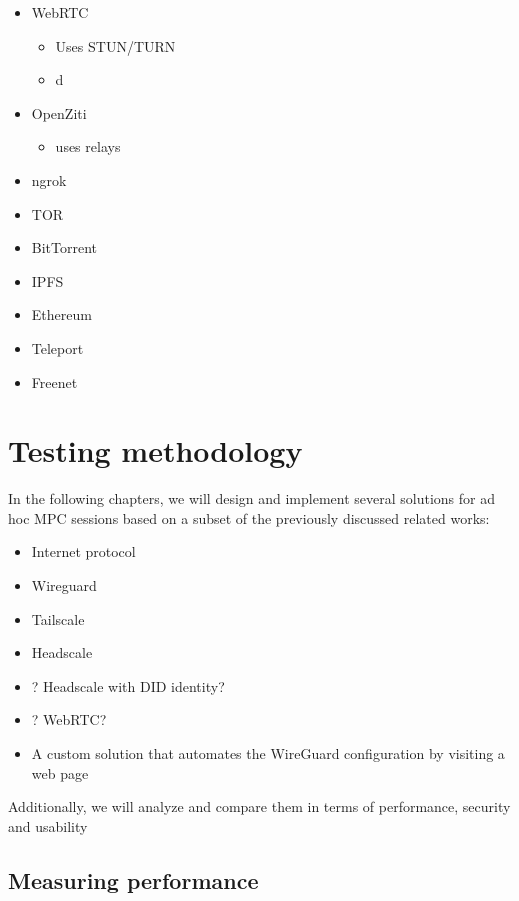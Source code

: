 \begin{itemize}
\tightlist
\item
  WebRTC

  \begin{itemize}
  \tightlist
  \item
    Uses STUN/TURN
  \item
    d
  \end{itemize}
\item
  OpenZiti

  \begin{itemize}
  \tightlist
  \item
    uses relays
  \end{itemize}
\item
  ngrok
\item
  TOR
\item
  BitTorrent
\item
  IPFS
\item
  Ethereum
\item
  Teleport
\item
  Freenet
\end{itemize}

\hypertarget{testing-methodology}{%
\chapter{Testing methodology}\label{testing-methodology}}

In the following chapters, we will design and implement several
solutions for ad hoc MPC sessions based on a subset of the previously
discussed related works:

\begin{itemize}
\tightlist
\item
  Internet protocol
\item
  Wireguard
\item
  Tailscale
\item
  Headscale
\item
  ? Headscale with DID identity?
\item
  ? WebRTC?
\item
  A custom solution that automates the WireGuard configuration by
  visiting a web page
\end{itemize}

Additionally, we will analyze and compare them in terms of performance,
security and usability

\hypertarget{measuring-performance}{%
\section{Measuring performance}\label{measuring-performance}}

